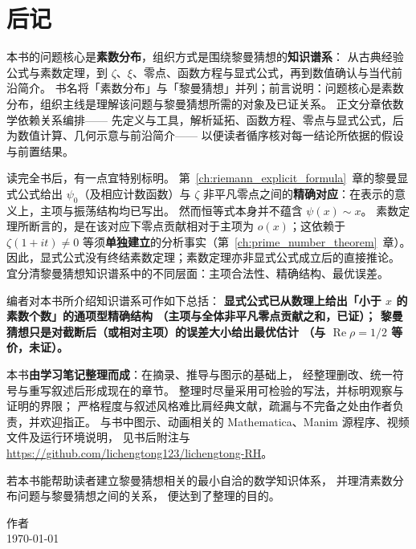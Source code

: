 \chapter*{\texorpdfstring{\centering 后记}{后记}}
\setlength{\parindent}{2em}
\setlength{\parskip}{0.2em}

本书的问题核心是\textbf{素数分布}，组织方式是围绕黎曼猜想的\textbf{知识谱系}：
从古典经验公式与素数定理，到 $\zeta$、$\xi$、零点、函数方程与显式公式，再到数值确认与当代前沿简介。
书名将「素数分布」与「黎曼猜想」并列；前言说明：问题核心是素数分布，组织主线是理解该问题与黎曼猜想所需的对象及已证关系。
正文分章依数学依赖关系编排——
先定义与工具，解析延拓、函数方程、零点与显式公式，后为数值计算、几何示意与前沿简介——
以便读者循序核对每一结论所依据的假设与前置结果。

读完全书后，有一点宜特别标明。
第~\ref{ch:riemann_explicit_formula}~章的黎曼显式公式给出 $\psi_0$（及相应计数函数）与 $\zeta$ 非平凡零点之间的\textbf{精确对应}：在表示的意义上，主项与振荡结构均已写出。
然而恒等式本身并不蕴含 $\psi(x)\sim x$。
素数定理所断言的，是在该对应下零点贡献相对于主项为 $o(x)$；这依赖于 $\zeta(1+it)\neq 0$ 等须\textbf{单独建立}的分析事实（第~\ref{ch:prime_number_theorem}~章）。
因此，显式公式没有终结素数定理；素数定理亦非显式公式成立后的直接推论。
宜分清黎曼猜想知识谱系中的不同层面：主项合法性、精确结构、最优误差。

编者对本书所介绍知识谱系可作如下总括：
\textbf{显式公式已从数理上给出「小于 $x$ 的素数个数」的通项型精确结构
（主项与全体非平凡零点贡献之和，已证）；
黎曼猜想只是对截断后（或相对主项）的误差大小给出最优估计
（与 $\operatorname{Re}\rho=1/2$ 等价，未证）。}

本书\textbf{由学习笔记整理而成}：在摘录、推导与图示的基础上，
经整理删改、统一符号与重写叙述后形成现在的章节。
整理时尽量采用可检验的写法，并标明观察与证明的界限；
严格程度与叙述风格难比肩经典文献，疏漏与不完备之处由作者负责，并欢迎指正。
与书中图示、动画相关的 Mathematica、Manim 源程序、视频文件及运行环境说明，
见书后附注与 \url{https://github.com/lichengtong123/lichengtong-RH}。

若本书能帮助读者建立黎曼猜想相关的最小自洽的数学知识体系，
并理清素数分布问题与黎曼猜想之间的关系，
便达到了整理的目的。

\vspace{1.5em}
\begin{flushright}
作者\\
\today
\end{flushright}
